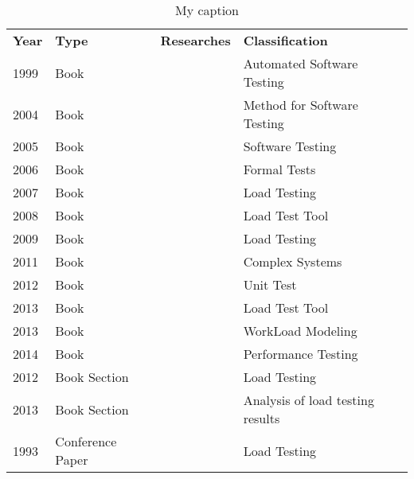 \begin{table}[]
\centering
\caption{My caption}
\label{my-label}
\begin{tabular}{llll}
\rowcolor[HTML]{C0C0C0} 
\textbf{Year} & \textbf{Type}    & \textbf{Researches}             & \textbf{Classification}          \\
1999          & Book             & \cite{Dustin1999}               & Automated Software Testing       \\
2004          & Book             & \cite{Perry2004}                & Method for Software Testing      \\
2005          & Book             & \cite{Lewis2005}                & Software Testing                 \\
2006          & Book             & \cite{Havelund2006}             & Formal Tests                     \\
2007          & Book             & \cite{Corporation2007}          & Load Testing                     \\
2008          & Book             & \cite{Halili2008}               & Load Test Tool                   \\
2009          & Book             & \cite{Molyneaux2009}            & Load Testing                     \\
2011          & Book             & \cite{Oliner2011}               & Complex Systems                  \\
2012          & Book             & \cite{Kaczanowski2012}          & Unit Test                        \\
2013          & Book             & \cite{Erinle2013}               & Load Test Tool                   \\
2013          & Book             & \cite{Feitelson2013}            & WorkLoad Modeling                \\
2014          & Book             & \cite{Geiger}                   & Performance Testing              \\
2012          & Book Section     & \cite{Avritzer2012a}            & Load Testing                     \\
2013          & Book Section     & \cite{Mayo2013}                 & Analysis of load testing results \\
1993          & Conference Paper & \cite{Avritzer1993d}            & Load Testing                     \\

\end{tabular}
\end{table}
